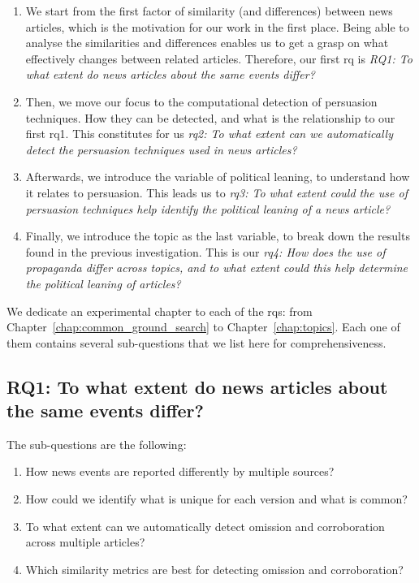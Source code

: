\begin{enumerate}
    \item We start from the first factor of similarity (and differences) between news articles, which is the motivation for our work in the first place. Being able to analyse the similarities and differences enables us to get a grasp on what effectively changes between related articles. Therefore, our first \acrfull{rq} is \emph{RQ1: To what extent do news articles about the same events differ?}
    \item Then, we move our focus to the computational detection of persuasion techniques. How they can be detected, and what is the relationship to our first \acrshort{rq}1. This constitutes for us \emph{\acrshort{rq}2: To what extent can we automatically detect the persuasion techniques used in news articles?} 
    \item Afterwards, we introduce the variable of political leaning, to understand how it relates to persuasion. This leads us to \emph{\acrshort{rq}3: To what extent could the use of persuasion techniques help identify the political leaning of a news article?}
    \item Finally, we introduce the topic as the last variable, to break down the results found in the previous investigation. This is our \emph{\acrshort{rq}4: How does the use of propaganda differ across topics, and to what extent could this help determine the political leaning of articles?}
\end{enumerate}

We dedicate an experimental chapter to each of the \acrlong{rq}s: from Chapter~\ref{chap:common_ground_search} to Chapter~\ref{chap:topics}.
Each one of them contains several sub-questions that we list here for comprehensiveness.


\subsection*{RQ1: To what extent do news articles about the same events differ?}

The sub-questions are the following:
\begin{enumerate}[label={\textbf{RQ1.\arabic*:}},leftmargin=2cm]
    \item How news events are reported differently by multiple sources?
    \item How could we identify what is unique for each version and what is common? 
    \item To what extent can we automatically detect omission and corroboration across multiple articles?
    \item Which similarity metrics are best for detecting omission and corroboration?
\end{enumerate}

